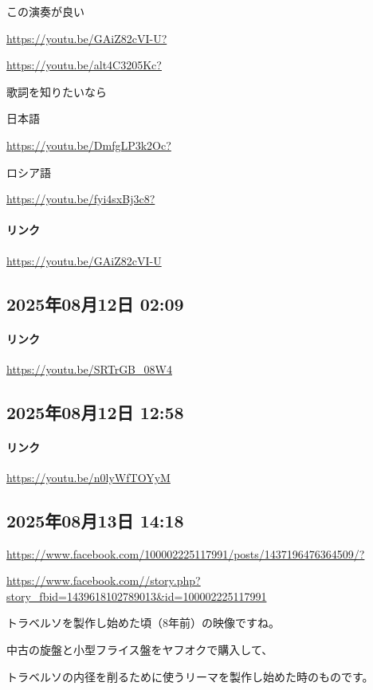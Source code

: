 この演奏が良い

\url{https://youtu.be/GAiZ82cVI-U?}

\url{https://youtu.be/alt4C3205Kc?}

歌詞を知りたいなら

日本語

\url{https://youtu.be/DmfgLP3k2Oc?}

ロシア語

\url{https://youtu.be/fyi4sxBj3c8?}

\paragraph{リンク}
\url{https://youtu.be/GAiZ82cVI-U}

\subsection*{2025年08月12日 02:09}

\paragraph{リンク}
\url{https://youtu.be/SRTrGB_08W4}

\subsection*{2025年08月12日 12:58}

\paragraph{リンク}
\url{https://youtu.be/n0lyWfTOYyM}

\subsection*{2025年08月13日 14:18}

\url{https://www.facebook.com/100002225117991/posts/1437196476364509/?}

\url{https://www.facebook.com//story.php?story_fbid=1439618102789013&id=100002225117991}

トラベルソを製作し始めた頃（8年前）の映像ですね。

中古の旋盤と小型フライス盤をヤフオクで購入して、

トラベルソの内径を削るために使うリーマを製作し始めた時のものです。

